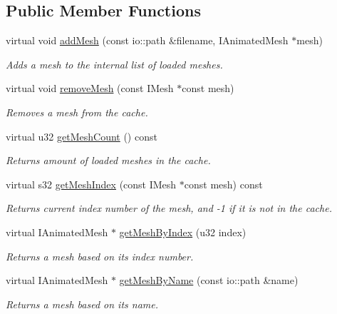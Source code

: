 \subsection*{Public Member Functions}
\begin{DoxyCompactItemize}
\item 
virtual void \hyperlink{classirr_1_1scene_1_1_c_mesh_cache_ad3f3d5146c367abd2285b23722da00d7}{add\-Mesh} (const io\-::path \&filename, I\-Animated\-Mesh $\ast$mesh)
\begin{DoxyCompactList}\small\item\em Adds a mesh to the internal list of loaded meshes. \end{DoxyCompactList}\item 
virtual void \hyperlink{classirr_1_1scene_1_1_c_mesh_cache_a270096cdc559b5a2c0d858f5eec5bacc}{remove\-Mesh} (const I\-Mesh $\ast$const mesh)
\begin{DoxyCompactList}\small\item\em Removes a mesh from the cache. \end{DoxyCompactList}\item 
virtual u32 \hyperlink{classirr_1_1scene_1_1_c_mesh_cache_a488ec97ceae6678ed58bbaf9df834d4c}{get\-Mesh\-Count} () const 
\begin{DoxyCompactList}\small\item\em Returns amount of loaded meshes in the cache. \end{DoxyCompactList}\item 
virtual s32 \hyperlink{classirr_1_1scene_1_1_c_mesh_cache_a5dae74d158d7283a8c1b42bdc6228407}{get\-Mesh\-Index} (const I\-Mesh $\ast$const mesh) const 
\begin{DoxyCompactList}\small\item\em Returns current index number of the mesh, and -\/1 if it is not in the cache. \end{DoxyCompactList}\item 
virtual I\-Animated\-Mesh $\ast$ \hyperlink{classirr_1_1scene_1_1_c_mesh_cache_a618216fc30df288171920e3f73018074}{get\-Mesh\-By\-Index} (u32 index)
\begin{DoxyCompactList}\small\item\em Returns a mesh based on its index number. \end{DoxyCompactList}\item 
virtual I\-Animated\-Mesh $\ast$ \hyperlink{classirr_1_1scene_1_1_c_mesh_cache_ae3d8e1e0199c7952caae4fc1da297a77}{get\-Mesh\-By\-Name} (const io\-::path \&name)
\begin{DoxyCompactList}\small\item\em Returns a mesh based on its name. \end{DoxyCompactList}\item 

\end{DoxyCompactItemize}
